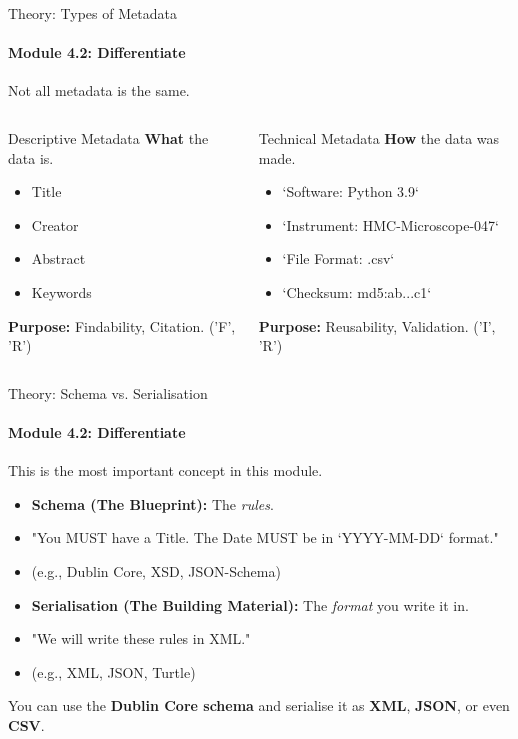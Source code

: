 \begin{frame}{Theory: Types of Metadata}
    \framesubtitle{Module 4.2: Differentiate}
    Not all metadata is the same.
    
    \begin{columns}
        \begin{block}{Descriptive Metadata}
            \textbf{What} the data is.
            \begin{itemize}
                \item Title
                \item Creator
                \item Abstract
                \item Keywords
            \end{itemize}
            \textbf{Purpose:} Findability, Citation. ('F', 'R')
        \end{block}
        
        \begin{block}{Technical Metadata}
            \textbf{How} the data was made.
            \begin{itemize}
                \item `Software: Python 3.9`
                \item `Instrument: HMC-Microscope-047`
                \item `File Format: .csv`
                \item `Checksum: md5:ab...c1`
            \end{itemize}
            \textbf{Purpose:} Reusability, Validation. ('I', 'R')
        \end{block}
    \end{columns}
\end{frame}

\begin{frame}{Theory: Schema vs. Serialisation}
    \framesubtitle{Module 4.2: Differentiate}
    This is the most important concept in this module.
    
    
    \begin{itemize}
        \item \textbf{Schema (The Blueprint):} The \textit{rules}.
        \item "You MUST have a Title. The Date MUST be in `YYYY-MM-DD` format."
        \item (e.g., Dublin Core, XSD, JSON-Schema)
        \pause
        \item \textbf{Serialisation (The Building Material):} The \textit{format} you write it in.
        \item "We will write these rules in XML."
        \item (e.g., XML, JSON, Turtle)
    \end{itemize}
    \pause
    You can use the \textbf{Dublin Core schema} and serialise it as \textbf{XML}, \textbf{JSON}, or even \textbf{CSV}.
\end{frame}

